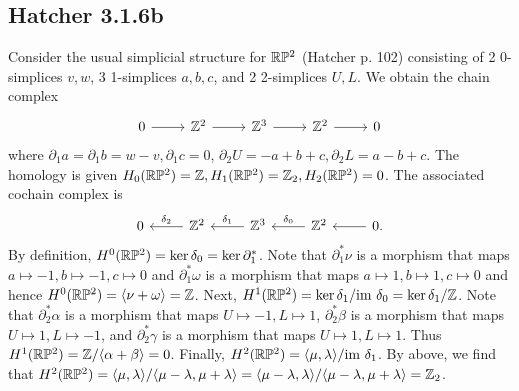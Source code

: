 \documentclass{../mathnotes}
\begin{document}
\subsection*{Hatcher 3.1.6b}
Consider the usual simplicial structure for $\mathbb{R}\mathbb{P}^2$ (Hatcher p. 102) consisting
of 2 0-simplices $v,w$, 3 1-simplices $a,b,c$, and 2 2-simplices $U,L$. We obtain the chain
complex
\begin{equation*}
    \begin{tikzcd}
        0\ar{r} & \Z^2\ar{r} & \Z^3\ar{r} & \Z^2\ar{r} & 0
    \end{tikzcd}
\end{equation*}
where $\partial_1a=\partial_1b=w-v, \partial_1c=0$, $\partial_2U=-a+b+c,\partial_2L=a-b+c$.
The homology is given $H_0(\mathbb{R}\mathbb{P}^2)=\mathbb{Z}, H_1(\mathbb{R}\mathbb{P}^2)=\mathbb{Z}_2, H_2(\mathbb{R}\mathbb{P}^2)=0$. The associated
cochain complex is
\begin{equation*}
    \begin{tikzcd}
        0 & \Z^2\ar[swap]{l}{\delta_2} & \Z^3\ar[swap]{l}{\delta_1} & \Z^2\ar[swap]{l}{\delta_0} & 0\ar{l}.
    \end{tikzcd}
\end{equation*}
By definition, $H^0(\mathbb{R}\mathbb{P}^2)=\ker\delta_0=\ker\partial_1^*$. Note that $\partial_1^*\nu$ is a morphism that maps
$a\mapsto -1,b\mapsto -1,c\mapsto 0$ and $\partial_1^*\omega$ is a morphism that maps $a\mapsto1,b\mapsto1,c\mapsto0$
and hence $H^0(\mathbb{R}\mathbb{P}^2)=\langle \nu+\omega\rangle=\mathbb{Z}$. Next, $H^1(\mathbb{R}\mathbb{P}^2)=\ker\delta_1/\text{im }\delta_0=\ker\delta_1/\mathbb{Z}$.
Note that $\partial_2^*\alpha$ is a morphism that maps $U\mapsto -1,L\mapsto 1$, $\partial_2^*\beta$ is a morphism
that maps $U\mapsto 1,L\mapsto -1$, and $\partial_2^*\gamma$ is a morphism that maps $U\mapsto 1,L\mapsto 1$. Thus
$H^1(\mathbb{R}\mathbb{P}^2)=\mathbb{Z}/\langle\alpha+\beta\rangle=0$. Finally, $H^2(\mathbb{R}\mathbb{P}^2)=\langle\mu,\lambda\rangle/\text{im }\delta_1$.
By above, we find that $H^2(\mathbb{R}\mathbb{P}^2)=\langle\mu,\lambda\rangle/\langle\mu-\lambda,\mu+\lambda\rangle=
\langle \mu-\lambda,\lambda\rangle/\langle\mu-\lambda,\mu+\lambda\rangle=\mathbb{Z}_2$.
\end{document}
